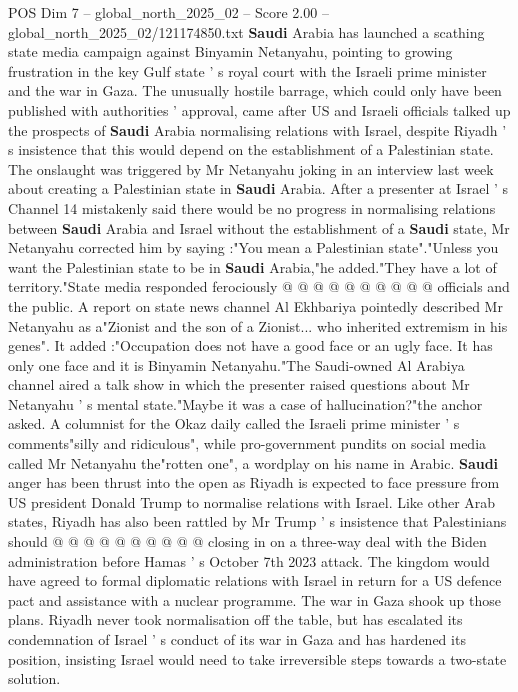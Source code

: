 \begin{textsample}{POS Dim 7 – global\_north\_2025\_02 – Score 2.00 – global\_north\_2025\_02/121174850.txt}  \label{ex:f7_pos_384}
\textbf{Saudi} Arabia has launched a scathing state media campaign against Binyamin Netanyahu, pointing to growing frustration in the key Gulf state ' s royal court with the Israeli prime minister and the war in Gaza.
The unusually hostile barrage, which could only have been published with authorities ' approval, came after US and Israeli officials talked up the prospects of \textbf{Saudi} Arabia normalising relations with Israel, despite Riyadh ' s insistence that this would depend on the establishment of a Palestinian state.
The onslaught was triggered by Mr Netanyahu joking in an interview last week about creating a Palestinian state in \textbf{Saudi} Arabia.
After a presenter at Israel ' s Channel 14 mistakenly said there would be no progress in normalising relations between \textbf{Saudi} Arabia and Israel without the establishment of a \textbf{Saudi} state, Mr Netanyahu corrected him by saying :"You mean a Palestinian state"."Unless you want the Palestinian state to be in \textbf{Saudi} Arabia,"he added."They have a lot of territory."State media responded ferociously @ @ @ @ @ @ @ @ @ @ officials and the public.
A report on state news channel Al Ekhbariya pointedly described Mr Netanyahu as a"Zionist and the son of a Zionist... who inherited extremism in his genes".
It added :"Occupation does not have a good face or an ugly face.
It has only one face and it is Binyamin Netanyahu."The Saudi-owned Al Arabiya channel aired a talk show in which the presenter raised questions about Mr Netanyahu ' s mental state."Maybe it was a case of hallucination?"the anchor asked.
A columnist for the Okaz daily called the Israeli prime minister ' s comments"silly and ridiculous", while pro-government pundits on social media called Mr Netanyahu the"rotten one", a wordplay on his name in Arabic. \textbf{Saudi} anger has been thrust into the open as Riyadh is expected to face pressure from US president Donald Trump to normalise relations with Israel.
Like other Arab states, Riyadh has also been rattled by Mr Trump ' s insistence that Palestinians should @ @ @ @ @ @ @ @ @ @ closing in on a three-way deal with the Biden administration before Hamas ' s October 7th 2023 attack.
The kingdom would have agreed to formal diplomatic relations with Israel in return for a US defence pact and assistance with a nuclear programme.
The war in Gaza shook up those plans.
Riyadh never took normalisation off the table, but has escalated its condemnation of Israel ' s conduct of its war in Gaza and has hardened its position, insisting Israel would need to take irreversible steps towards a two-state solution.

\end{textsample}
